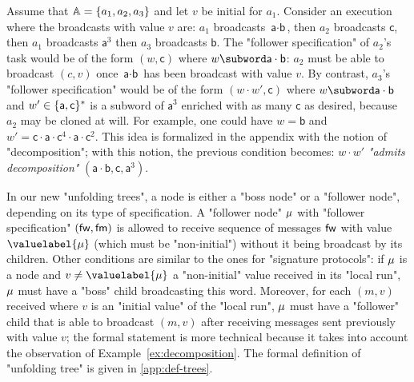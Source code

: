 \begin{example}

\label{ex:decomposition}
Assume that $\mathbb{A} = \{a_1,a_2,a_3\}$ and let $v$ be initial for $a_1$. Consider an execution where the broadcasts with value $v$ are: $a_1$ broadcasts $\textsf{a} \cdot \textsf{b}$, then $a_2$ broadcasts $\textsf{c}$, then $a_1$ broadcasts $\textsf{a}^3$ then $a_3$ broadcasts $\textsf{b}$. The "follower specification" of $a_2$'s task would be of the form $(w, \textsf{c})$ where $w \subword \textsf{a} \cdot \textsf{b}$: $a_2$ must be able to broadcast $(c,v)$ once $\textsf{a} \cdot \textsf{b}$ has been broadcast with value $v$. By contrast, $a_3$'s "follower specification" would be of the form $(w \cdot w', \textsf{c})$ where $w \subword \textsf{a} \cdot \textsf{b}$ and $w' \in \{\textsf{a},\textsf{c}\}^*$ is a subword of $\textsf{a}^3$ enriched with as many $\textsf{c}$ as desired, because $a_2$ may be cloned at will.
For example, one could have $w= \textsf{b} $ and $w' = \textsf{c} \cdot \textsf{a} \cdot \textsf{c}^4 \cdot \textsf{a} \cdot \textsf{c}^2$. This idea is formalized in the appendix with the notion of "decomposition"; with this notion, the previous condition becomes: $w \cdot w'$ \emph{"admits decomposition"} $(\textsf{a} \cdot \textsf{b}, \textsf{c}, \textsf{a}^3)$.   
\end{example}

In our new "unfolding trees", a node is either a "boss node" or a "follower node", depending on its type of specification. 
A "follower node" $\mu$ with "follower specification" $(\mathsf{fw}, \mathsf{fm})$ is allowed to receive sequence of messages $\mathsf{fw}$ with value $\valuelabel{\node}$ (which must be "non-initial") without it being broadcast by its children. 
Other conditions are similar to the ones for "signature protocols": if $\mu$ is a node and $v \ne \valuelabel{\node}$ a "non-initial" value received in its "local run", $\mu$ must have a "boss" child broadcasting this word. Moreover, for each $(m,v)$ received where $v$ is an "initial value" of the "local run", $\mu$ must have a "follower" child that is able to broadcast $(m,v)$ after receiving messages sent previously with value $v$; the formal statement is more technical because it takes into account the observation of Example~\ref{ex:decomposition}. 
The formal definition of "unfolding tree" is given in \cref{app:def-trees}.



